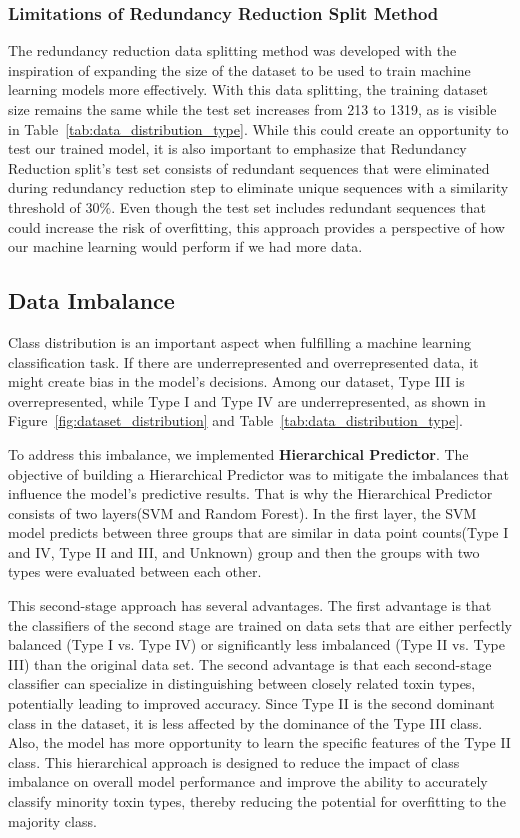 \subsubsection{Limitations of Redundancy Reduction Split Method}
The redundancy reduction data splitting method was developed with the inspiration of expanding the size of the dataset to be used to train machine learning models more effectively. With this data splitting, the training dataset size remains the same while the test set increases from 213 to 1319, as is visible in Table~\ref{tab:data_distribution_type}. While this could create an opportunity to test our trained model, it is also important to emphasize that Redundancy Reduction split's test set consists of redundant sequences that were eliminated during redundancy reduction step to eliminate unique sequences with a similarity threshold of 30\%. Even though the test set includes redundant sequences that could increase the risk of overfitting, this approach provides a perspective of how our machine learning would perform if we had more data.


\subsection{Data Imbalance}
Class distribution is an important aspect when fulfilling a machine learning classification task.
If there are underrepresented and overrepresented data, it might create bias in the model's decisions. Among our dataset, Type III is overrepresented, while Type I and Type IV are underrepresented, as shown in Figure~\ref{fig:dataset_distribution} and Table~\ref{tab:data_distribution_type}.

To address this imbalance, we implemented \textbf{Hierarchical Predictor}. The objective of building a Hierarchical Predictor was to mitigate the imbalances that influence the model's predictive results. That is why the Hierarchical Predictor consists of two layers(\gls{SVM} and Random Forest). In the first layer, the \gls{SVM} model predicts between three groups that are similar in data point counts(Type I and IV, Type II and III, and Unknown)  group and then the groups with two types were evaluated between each other. 

This second-stage approach has several advantages.
The first advantage is that the classifiers of the second stage are trained on data sets that are either perfectly balanced (Type I vs. Type IV) or significantly less imbalanced (Type II vs. Type III) than the original data set.   
The second advantage is that each second-stage classifier can specialize in distinguishing between closely related toxin types, potentially leading to improved accuracy.
Since Type II is the second dominant class in the dataset, it is less affected by the dominance of the Type III class.
Also, the model has more opportunity to learn the specific features of the Type II class.
This hierarchical approach is designed to reduce the impact of class imbalance on overall model performance and improve the ability to accurately classify minority toxin types, thereby reducing the potential for overfitting to the majority class.

